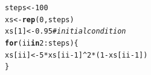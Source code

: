 \documentclass[a4paper]{article}\usepackage[]{graphicx}\usepackage[]{color}
\makeatletter
\newcommand{\hlnum}[1]{\textcolor[rgb]{0.686,0.059,0.569}{#1}}%
\newcommand{\hlcom}[1]{\textcolor[rgb]{0.678,0.584,0.686}{\textit{#1}}}%
\newcommand{\hlopt}[1]{\textcolor[rgb]{0,0,0}{#1}}%
\newcommand{\hlstd}[1]{\textcolor[rgb]{0.345,0.345,0.345}{#1}}%
\newcommand{\hlkwa}[1]{\textcolor[rgb]{0.161,0.373,0.58}{\textbf{#1}}}%
\newcommand{\hlkwb}[1]{\textcolor[rgb]{0.69,0.353,0.396}{#1}}%
\newcommand{\hlkwd}[1]{\textcolor[rgb]{0.737,0.353,0.396}{\textbf{#1}}}%
\newenvironment{kframe}{%
 \def\at@end@of@kframe{}%
 \ifinner\ifhmode%
  \def\at@end@of@kframe{\end{minipage}}%
  \begin{minipage}{\columnwidth}%
 \fi\fi%
 \def\FrameCommand##1{\hskip\@totalleftmargin \hskip-\fboxsep
 \colorbox{shadecolor}{##1}\hskip-\fboxsep
     \hskip-\linewidth \hskip-\@totalleftmargin \hskip\columnwidth}%
 \MakeFramed {\advance\hsize-\width
   \@totalleftmargin\z@ \linewidth\hsize
   \@setminipage}}%
 {\par\unskip\endMakeFramed%
 \at@end@of@kframe}
\newenvironment{knitrout}{}{} %
\makeatother
\begin{document}
\begin{knitrout}
\color{fgcolor}\begin{kframe}
\begin{alltt}
\hlstd{steps} \hlkwb{<-} \hlnum{100}
\hlstd{xs} \hlkwb{<-} \hlkwd{rep}\hlstd{(}\hlnum{0}\hlstd{, steps)}
\hlstd{xs[}\hlnum{1}\hlstd{]} \hlkwb{<-} \hlnum{0.95}  \hlcom{# initial condition}
\hlkwa{for} \hlstd{(ii} \hlkwa{in} \hlnum{2}\hlopt{:}\hlstd{steps) \{}
    \hlstd{xs[ii]} \hlkwb{<-} \hlnum{5} \hlopt{*} \hlstd{xs[ii} \hlopt{-} \hlnum{1}\hlstd{]}\hlopt{^}\hlnum{2} \hlopt{*} \hlstd{(}\hlnum{1} \hlopt{-} \hlstd{xs[ii} \hlopt{-} \hlnum{1}\hlstd{])}
\hlstd{\}}
\end{alltt}
\end{kframe}
\end{knitrout}
\end{document}
